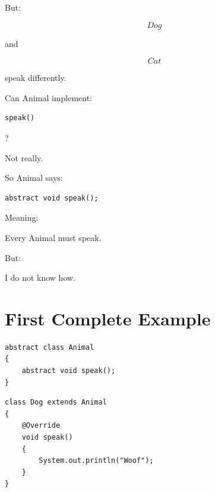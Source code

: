 \documentclass[11pt,a4paper]{book}
\begin{document}
But:

\[
Dog
\]

and

\[
Cat
\]

speak differently.


Can Animal implement:

\begin{verbatim}
speak()
\end{verbatim}

?


Not really.


So Animal says:

\begin{verbatim}
abstract void speak();
\end{verbatim}


Meaning:

\begin{center}
Every Animal must speak.
\end{center}


But:

\begin{center}
I do not know how.
\end{center}


\section{First Complete Example}

\begin{verbatim}
abstract class Animal
{
    abstract void speak();
}
\end{verbatim}


\begin{verbatim}
class Dog extends Animal
{
    @Override
    void speak()
    {
        System.out.println("Woof");
    }
}
\end{verbatim}
\end{document}
